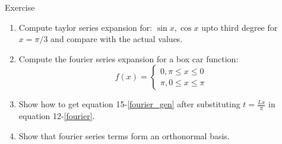 \documentclass[11pt,titlepage,fleqn]{article}
\begin{document}
\begin{section}{Exercise}
\begin{enumerate}
\item Compute taylor series expansion for: $\sin x, \cos x$ upto third degree for $x = \pi/3$ and compare with the actual values.

\item Compute the fourier series expansion for a box car function:
\begin{equation}
f(x) = \begin{cases}
0, \pi \leq x \leq 0\\
\pi , 0 \leq x \leq \pi
\end{cases}
\end{equation}

\item Show how to get equation 15-\ref{fourier_gen} after substituting $t = \frac{Lx}{\pi}$ in equation 12-\ref{fourier}.

\item Show that fourier series terms form an orthonormal basis.

\end{enumerate}

\end{section}
\end{document}
